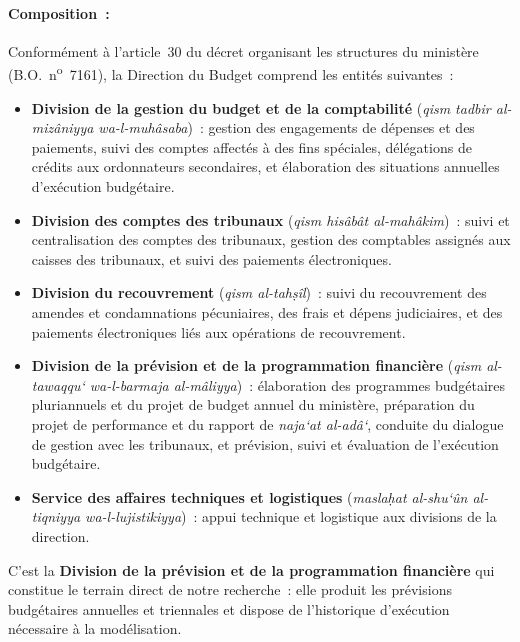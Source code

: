\paragraph{Composition~:}

Conform\'ement \`a l'article~30 du d\'ecret organisant les structures du minist\`ere (B.O.\ n\textsuperscript{o}~7161), la Direction du Budget comprend les entit\'es suivantes~:

\begin{itemize}
    \item \textbf{Division de la gestion du budget et de la comptabilit\'e} (\textit{qism tadbir al-miz\^aniyya wa-l-muh\^asaba})~: gestion des engagements de d\'epenses et des paiements, suivi des comptes affect\'es \`a des fins sp\'eciales, d\'el\'egations de cr\'edits aux ordonnateurs secondaires, et \'elaboration des situations annuelles d'ex\'ecution budg\'etaire.

    \item \textbf{Division des comptes des tribunaux} (\textit{qism his\^ab\^at al-mah\^akim})~: suivi et centralisation des comptes des tribunaux, gestion des comptables assign\'es aux caisses des tribunaux, et suivi des paiements \'electroniques.

    \item \textbf{Division du recouvrement} (\textit{qism al-tah\d{s}\^il})~: suivi du recouvrement des amendes et condamnations p\'ecuniaires, des frais et d\'epens judiciaires, et des paiements \'electroniques li\'es aux op\'erations de recouvrement.

    \item \textbf{Division de la pr\'evision et de la programmation financi\`ere} (\textit{qism al-tawaqqu\textquoteleft{} wa-l-barmaja al-m\^aliyya})~: \'elaboration des programmes budg\'etaires pluriannuels et du projet de budget annuel du minist\`ere, pr\'eparation du projet de performance et du rapport de \textit{naja\textquoteleft{}at al-ad\^a\textquoteleft{}}, conduite du dialogue de gestion avec les tribunaux, et pr\'evision, suivi et \'evaluation de l'ex\'ecution budg\'etaire.

    \item \textbf{Service des affaires techniques et logistiques} (\textit{masla\d{h}at al-shu\textquoteleft\^un al-tiqniyya wa-l-lujistikiyya})~: appui technique et logistique aux divisions de la direction.
\end{itemize}

C'est la \textbf{Division de la pr\'evision et de la programmation financi\`ere} qui constitue le terrain direct de notre recherche~: elle produit les pr\'evisions budg\'etaires annuelles et triennales et dispose de l'historique d'ex\'ecution n\'ecessaire \`a la mod\'elisation.

